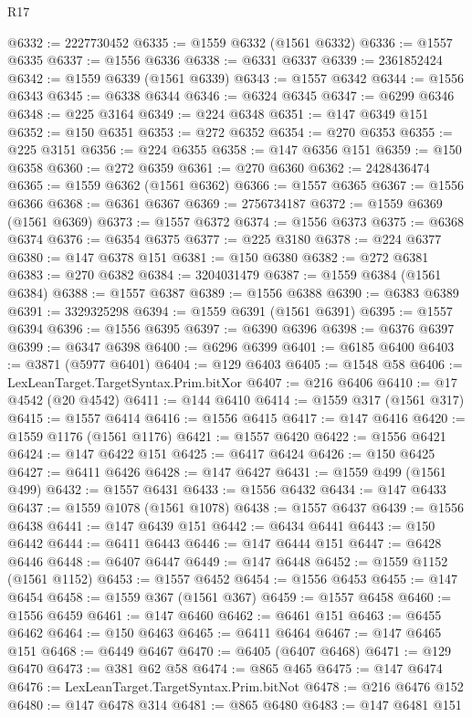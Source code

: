 \begin{lexlean}{R17}
\begin{coremodule}
@6332 := 2227730452
@6335 := @1559 @6332 (@1561 @6332)
@6336 := @1557 @6335
@6337 := @1556 @6336
@6338 := @6331 @6337
@6339 := 2361852424
@6342 := @1559 @6339 (@1561 @6339)
@6343 := @1557 @6342
@6344 := @1556 @6343
@6345 := @6338 @6344
@6346 := @6324 @6345
@6347 := @6299 @6346
@6348 := @225 @3164
@6349 := @224 @6348
@6351 := @147 @6349 @151
@6352 := @150 @6351
@6353 := @272 @6352
@6354 := @270 @6353
@6355 := @225 @3151
@6356 := @224 @6355
@6358 := @147 @6356 @151
@6359 := @150 @6358
@6360 := @272 @6359
@6361 := @270 @6360
@6362 := 2428436474
@6365 := @1559 @6362 (@1561 @6362)
@6366 := @1557 @6365
@6367 := @1556 @6366
@6368 := @6361 @6367
@6369 := 2756734187
@6372 := @1559 @6369 (@1561 @6369)
@6373 := @1557 @6372
@6374 := @1556 @6373
@6375 := @6368 @6374
@6376 := @6354 @6375
@6377 := @225 @3180
@6378 := @224 @6377
@6380 := @147 @6378 @151
@6381 := @150 @6380
@6382 := @272 @6381
@6383 := @270 @6382
@6384 := 3204031479
@6387 := @1559 @6384 (@1561 @6384)
@6388 := @1557 @6387
@6389 := @1556 @6388
@6390 := @6383 @6389
@6391 := 3329325298
@6394 := @1559 @6391 (@1561 @6391)
@6395 := @1557 @6394
@6396 := @1556 @6395
@6397 := @6390 @6396
@6398 := @6376 @6397
@6399 := @6347 @6398
@6400 := @6296 @6399
@6401 := @6185 @6400
@6403 := @3871 (@5977 @6401)
@6404 := @129 @6403
@6405 := @1548 @58
@6406 := LexLeanTarget.TargetSyntax.Prim.bitXor
@6407 := @216 @6406
@6410 := @17 @4542 (@20 @4542)
@6411 := @144 @6410
@6414 := @1559 @317 (@1561 @317)
@6415 := @1557 @6414
@6416 := @1556 @6415
@6417 := @147 @6416
@6420 := @1559 @1176 (@1561 @1176)
@6421 := @1557 @6420
@6422 := @1556 @6421
@6424 := @147 @6422 @151
@6425 := @6417 @6424
@6426 := @150 @6425
@6427 := @6411 @6426
@6428 := @147 @6427
@6431 := @1559 @499 (@1561 @499)
@6432 := @1557 @6431
@6433 := @1556 @6432
@6434 := @147 @6433
@6437 := @1559 @1078 (@1561 @1078)
@6438 := @1557 @6437
@6439 := @1556 @6438
@6441 := @147 @6439 @151
@6442 := @6434 @6441
@6443 := @150 @6442
@6444 := @6411 @6443
@6446 := @147 @6444 @151
@6447 := @6428 @6446
@6448 := @6407 @6447
@6449 := @147 @6448
@6452 := @1559 @1152 (@1561 @1152)
@6453 := @1557 @6452
@6454 := @1556 @6453
@6455 := @147 @6454
@6458 := @1559 @367 (@1561 @367)
@6459 := @1557 @6458
@6460 := @1556 @6459
@6461 := @147 @6460
@6462 := @6461 @151
@6463 := @6455 @6462
@6464 := @150 @6463
@6465 := @6411 @6464
@6467 := @147 @6465 @151
@6468 := @6449 @6467
@6470 := @6405 (@6407 @6468)
@6471 := @129 @6470
@6473 := @381 @62 @58
@6474 := @865 @465
@6475 := @147 @6474
@6476 := LexLeanTarget.TargetSyntax.Prim.bitNot
@6478 := @216 @6476 @152
@6480 := @147 @6478 @314
@6481 := @865 @6480
@6483 := @147 @6481 @151

\end{coremodule}
\end{lexlean}
